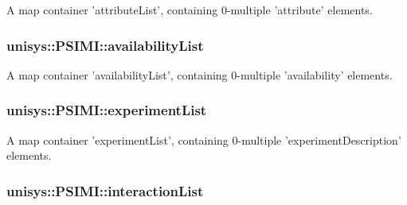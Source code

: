 A map container 'attribute\-List', containing 0-\/multiple 'attribute' elements. 

\hypertarget{classunisys_1_1PSIMI_a6101dbe254c85337509cdc0dc3870c6f}{
\subsubsection[{availability\-List}]{ unisys\-::\-P\-S\-I\-M\-I\-::availability\-List\hspace{0.3cm}{\ttfamily [private]}}}\label{classunisys_1_1PSIMI_a6101dbe254c85337509cdc0dc3870c6f}


A map container 'availability\-List', containing 0-\/multiple 'availability' elements. 

\hypertarget{classunisys_1_1PSIMI_a8cf7de1d5c6972fb0145cf4836eb9fac}{
\subsubsection[{experiment\-List}]{ unisys\-::\-P\-S\-I\-M\-I\-::experiment\-List\hspace{0.3cm}{\ttfamily [private]}}}\label{classunisys_1_1PSIMI_a8cf7de1d5c6972fb0145cf4836eb9fac}


A map container 'experiment\-List', containing 0-\/multiple 'experiment\-Description' elements. 

\hypertarget{classunisys_1_1PSIMI_ad294c997b1b45b4cfbcc01d10b029142}{
\subsubsection[{interaction\-List}]{ unisys\-::\-P\-S\-I\-M\-I\-::interaction\-List\hspace{0.3cm}{\ttfamily [private]}}}\label{classunisys_1_1PSIMI_ad294c997b1b45b4cfbcc01d10b029142}


